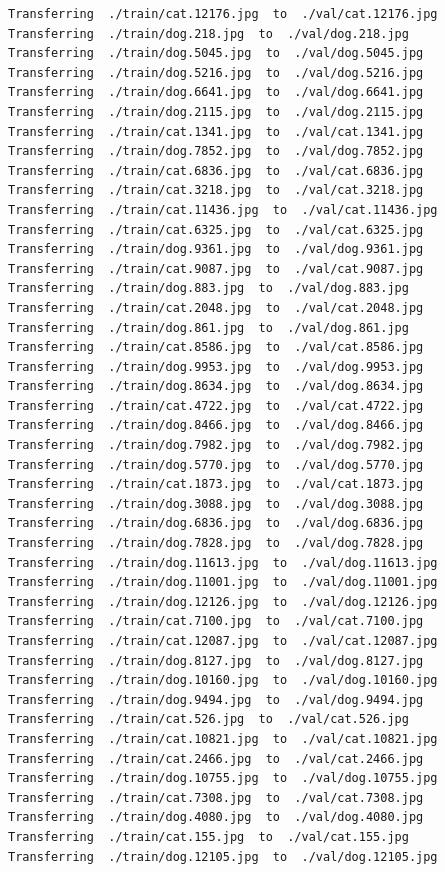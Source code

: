 \documentclass[]{book}
\theoremstyle{definition}
\theoremstyle{definition}
\theoremstyle{definition}
\theoremstyle{remark}
\begin{document}
\begin{verbatim}
Transferring  ./train/cat.12176.jpg  to  ./val/cat.12176.jpg
Transferring  ./train/dog.218.jpg  to  ./val/dog.218.jpg
Transferring  ./train/dog.5045.jpg  to  ./val/dog.5045.jpg
Transferring  ./train/dog.5216.jpg  to  ./val/dog.5216.jpg
Transferring  ./train/dog.6641.jpg  to  ./val/dog.6641.jpg
Transferring  ./train/dog.2115.jpg  to  ./val/dog.2115.jpg
Transferring  ./train/cat.1341.jpg  to  ./val/cat.1341.jpg
Transferring  ./train/dog.7852.jpg  to  ./val/dog.7852.jpg
Transferring  ./train/cat.6836.jpg  to  ./val/cat.6836.jpg
Transferring  ./train/cat.3218.jpg  to  ./val/cat.3218.jpg
Transferring  ./train/cat.11436.jpg  to  ./val/cat.11436.jpg
Transferring  ./train/cat.6325.jpg  to  ./val/cat.6325.jpg
Transferring  ./train/dog.9361.jpg  to  ./val/dog.9361.jpg
Transferring  ./train/cat.9087.jpg  to  ./val/cat.9087.jpg
Transferring  ./train/dog.883.jpg  to  ./val/dog.883.jpg
Transferring  ./train/cat.2048.jpg  to  ./val/cat.2048.jpg
Transferring  ./train/dog.861.jpg  to  ./val/dog.861.jpg
Transferring  ./train/cat.8586.jpg  to  ./val/cat.8586.jpg
Transferring  ./train/dog.9953.jpg  to  ./val/dog.9953.jpg
Transferring  ./train/dog.8634.jpg  to  ./val/dog.8634.jpg
Transferring  ./train/cat.4722.jpg  to  ./val/cat.4722.jpg
Transferring  ./train/dog.8466.jpg  to  ./val/dog.8466.jpg
Transferring  ./train/dog.7982.jpg  to  ./val/dog.7982.jpg
Transferring  ./train/dog.5770.jpg  to  ./val/dog.5770.jpg
Transferring  ./train/cat.1873.jpg  to  ./val/cat.1873.jpg
Transferring  ./train/dog.3088.jpg  to  ./val/dog.3088.jpg
Transferring  ./train/dog.6836.jpg  to  ./val/dog.6836.jpg
Transferring  ./train/dog.7828.jpg  to  ./val/dog.7828.jpg
Transferring  ./train/dog.11613.jpg  to  ./val/dog.11613.jpg
Transferring  ./train/dog.11001.jpg  to  ./val/dog.11001.jpg
Transferring  ./train/dog.12126.jpg  to  ./val/dog.12126.jpg
Transferring  ./train/cat.7100.jpg  to  ./val/cat.7100.jpg
Transferring  ./train/cat.12087.jpg  to  ./val/cat.12087.jpg
Transferring  ./train/dog.8127.jpg  to  ./val/dog.8127.jpg
Transferring  ./train/dog.10160.jpg  to  ./val/dog.10160.jpg
Transferring  ./train/dog.9494.jpg  to  ./val/dog.9494.jpg
Transferring  ./train/cat.526.jpg  to  ./val/cat.526.jpg
Transferring  ./train/cat.10821.jpg  to  ./val/cat.10821.jpg
Transferring  ./train/cat.2466.jpg  to  ./val/cat.2466.jpg
Transferring  ./train/dog.10755.jpg  to  ./val/dog.10755.jpg
Transferring  ./train/cat.7308.jpg  to  ./val/cat.7308.jpg
Transferring  ./train/dog.4080.jpg  to  ./val/dog.4080.jpg
Transferring  ./train/cat.155.jpg  to  ./val/cat.155.jpg
Transferring  ./train/dog.12105.jpg  to  ./val/dog.12105.jpg

\end{verbatim}
\end{document}
